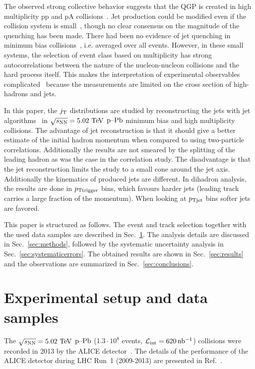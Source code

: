 The observed strong collective behavior suggests that the QGP is created in high multiplicity pp and pA collisions~\cite{Abelev:2012ola,Aad:2012gla,Chatrchyan:2013nka,Khachatryan:2010gv,Khachatryan:2016txc,Aidala:2016vgl}.  Jet production could be modified even if the collision system is small~\cite{Zhang:2013oca,Park:2016jap,TYWONIUK201485}, though no clear consensus on the magnitude of the quenching has been made. There had been no evidence of jet quenching in minimum bias collisions~\cite{Khachatryan:2016odn,ALICEjt}, i.e. averaged over all events.  However, in these small systems, the selection of event class based on multiplicity has strong autocorrelations between the nature of the nucleon-nucleon collisions and the hard process itself. This makes the interpretation of experimental observables complicated~\cite{Adam:2014qja, Adam:2016jfp,Nagle:2018nvi} because the measurements are limited on the cross section of high-\pt{} hadrons and jets. 
 

In this paper, the $j_{\rm T}$ distributions are studied by reconstructing the jets with jet algorithms~\cite{antikt} in $\sqrt{s_{\mathrm{NN}}} = 5.02~\mathrm{TeV}$ $\mbox{p--Pb}$ minimum bias and high multiplicity collisions. The advantage of jet reconstruction is that it should give a better estimate of the initial hadron momentum when compared to using two-particle correlations. Additionally the results are not smeared by the splitting of the leading hadron as was the case in the correlation study. The disadvantage is that the jet reconstruction limits the study to a small cone around the jet axis. Additionally the kinematics of produced jets are different. In dihadron analysis, the results are done in $p_{\rm Ttrigger}$ bins, which favours harder jets (leading track carries a large fraction of the momentum). When looking at $p_{\rm Tjet}$ bins softer jets are favored.

This paper is structured as follows. The event and track selection together with the used data samples are described in Sec.~\ref{sec:experimentaldetails}. The analysis details are discussed in Sec.~\ref{sec:methods}, followed by the systematic uncertainty analysis in Sec.~\ref{sec:systematicerrors}. The obtained results are shown in Sec.~\ref{sec:results} and the observations are summarized in Sec.~\ref{sec:conclusions}.


\section{Experimental setup and data samples}
\label{sec:experimentaldetails}
The $\sqrt{s_{\mathrm{NN}}} = 5.02~\mathrm{TeV}$ $\mbox{p--Pb}$ ($1.3 \cdot 10^{8}$ events, $\mathcal{L}_{\mathrm{int}} = \unit[620]{nb^{-1}}$) collisions were recorded in 2013 by the ALICE detector~\cite{aliceDetector}. The details of the performance of the ALICE detector during LHC Run~1 (2009-2013) are presented in Ref.~\cite{alicePerformance}.

